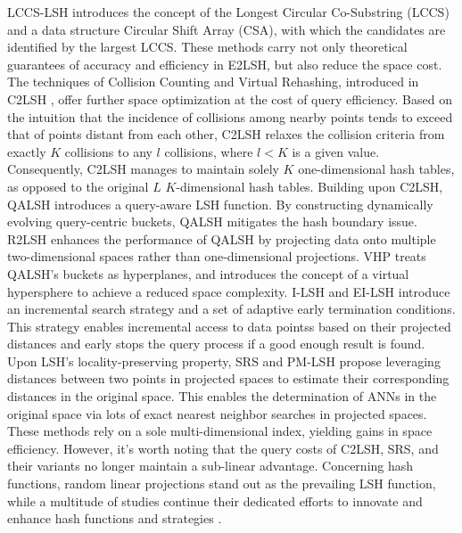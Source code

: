 \documentclass[11pt]{article}
\begin{document}
LCCS-LSH \cite{DBLP:conf/sigmod/LeiHKT20} introduces the concept of the Longest Circular Co-Substring (LCCS) and a data structure Circular Shift Array (CSA), with which the candidates are identified by the largest LCCS.  These methods carry not only theoretical guarantees of accuracy and efficiency in E2LSH, but also reduce the space cost.
The techniques of Collision Counting and Virtual Rehashing, introduced in C2LSH \cite{DBLP:conf/sigmod/GanFFN12}, offer further space optimization at the cost of query efficiency. Based on the intuition that the incidence of collisions among nearby points tends to exceed that of points distant from each other, C2LSH relaxes the collision criteria from exactly $K$ collisions to any $l$ collisions, where $l < K$ is a given value.  Consequently, C2LSH manages to maintain solely $K$ one-dimensional hash tables, as opposed to the original $L$ $K$-dimensional hash tables. Building upon C2LSH, QALSH \cite{DBLP:journals/pvldb/HuangFZFN15} introduces a query-aware LSH function. By constructing dynamically evolving query-centric buckets, QALSH mitigates the hash boundary issue. R2LSH \cite{DBLP:conf/icde/LuK20} enhances the performance of QALSH by projecting data onto multiple two-dimensional spaces rather than one-dimensional projections. VHP \cite{DBLP:journals/pvldb/LuWWK20} treats QALSH's buckets as hyperplanes, and introduces the concept of a virtual hypersphere to achieve a reduced space complexity. I-LSH \cite{DBLP:conf/icde/LiuWZWQ19} and EI-LSH \cite{DBLP:journals/vldb/LiuW00Q021} introduce an incremental search strategy and a set of adaptive early termination conditions. This strategy enables incremental access to data pointss based on their projected distances and early stops the query process if a good enough result is found. Upon LSH's locality-preserving property, SRS \cite{DBLP:journals/pvldb/SunWQZL14} and PM-LSH \cite{DBLP:journals/pvldb/ZhengZWHLJ20} propose leveraging distances between two points in projected spaces to estimate their corresponding distances in the original space. This enables the determination of ANNs in the original space via lots of exact nearest neighbor searches in projected spaces. These methods rely on a sole multi-dimensional index, yielding gains in space efficiency. However, it's worth noting that the query costs of C2LSH, SRS, and their variants no longer maintain a sub-linear advantage. Concerning hash functions, random linear projections stand out as the prevailing LSH function, while a multitude of studies continue their dedicated efforts to innovate and enhance hash functions and strategies \cite{DBLP:conf/focs/AndoniI06, DBLP:conf/stoc/AndoniR15, DBLP:conf/www/BawaCG05, DBLP:journals/tkde/LiWZWFLW23}.
\end{document}
